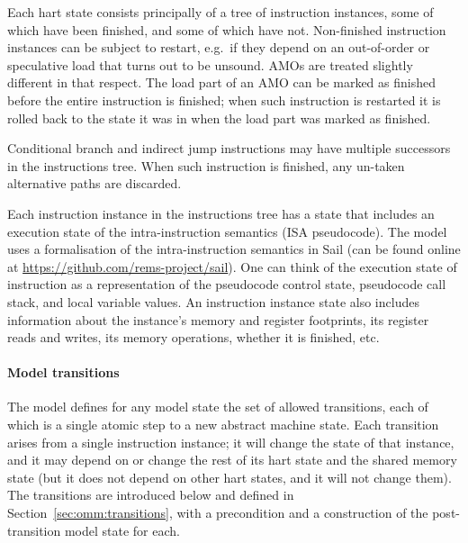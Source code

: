 Each hart state consists principally of a tree of instruction instances, some of which have been finished, and some of which have not.
Non-finished instruction instances can be subject to restart, e.g.~if they depend on an out-of-order or speculative load that turns out to be unsound.
AMOs are treated slightly different in that respect.
The load part of an AMO can be marked as finished before the entire instruction is finished; when such instruction is restarted it is rolled back to the state it was in when the load part was marked as finished.

Conditional branch and indirect jump instructions may have multiple successors in the instructions tree.
When such instruction is finished, any un-taken alternative paths are discarded.

Each instruction instance in the instructions tree has a state that includes an execution state of the intra-instruction semantics (ISA pseudocode).
The model uses a formalisation of the intra-instruction semantics in Sail (can be found online at \url{https://github.com/rems-project/sail}).
One can think of the execution state of instruction as a representation of the pseudocode control state, pseudocode call stack, and local variable values.
An instruction instance state also includes information about the instance's memory and register footprints, its register reads and writes, its memory operations, whether it is finished, etc.

\paragraph{Model transitions}
The model defines for any model state the set of allowed transitions, each of which is a single atomic step to a new abstract machine state.
Each transition arises from a single instruction instance; it will change the state of that instance, and it may depend on or change the rest of its hart state and the shared memory state (but it does not depend on other hart states, and it will not change them).
The transitions are introduced below and defined in Section~\ref{sec:omm:transitions}, with a precondition and a construction of the post-transition model state for each.

